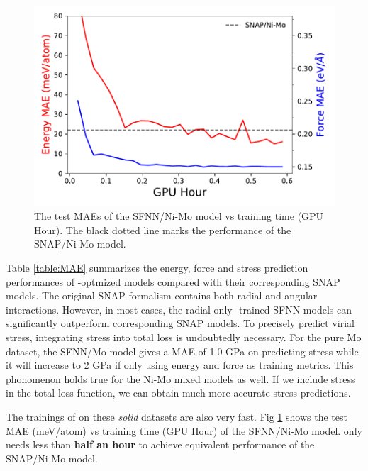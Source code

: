 \documentclass[prb,preprint]{revtex4-2}
\begin{document}
\begin{figure}[h!]
    \centering
    \includegraphics[scale=0.8]{figures/Fig5-snap.pdf}
\caption{\label{fig:snap_gpu_train_speed} The test MAEs of the SFNN/Ni-Mo model 
vs training time (GPU Hour). The black dotted line marks the performance of the
SNAP/Ni-Mo model.}
\end{figure}

Table \ref{table:MAE} summarizes the energy, force and stress prediction 
performances of \tensoralloy{}-optmized models compared with their corresponding 
SNAP models. The original SNAP formalism contains both radial and angular 
interactions. However, in most cases, the radial-only \tensoralloy{}-trained 
SFNN models can significantly outperform corresponding SNAP models. To precisely
predict virial stress, integrating stress into total loss is undoubtedly 
necessary. For the pure Mo dataset, the SFNN/Mo model gives a MAE of 1.0 GPa on 
predicting stress while it will increase to 2 GPa if only using energy and force 
as training metrics. This phonomenon holds true for the Ni-Mo mixed models as 
well. If we include stress in the total loss function, we can obtain much more 
accurate stress predictions.

The trainings of \tensoralloy{} on these \textit{solid} datasets are also very 
fast. Fig \ref{fig:snap_gpu_train_speed} shows the test MAE (meV/atom) vs 
training time (GPU Hour) of the SFNN/Ni-Mo model. \tensoralloy{} only needs less 
than \textbf{half an hour} to achieve equivalent performance of the 
SNAP/Ni-Mo model.
\end{document}
